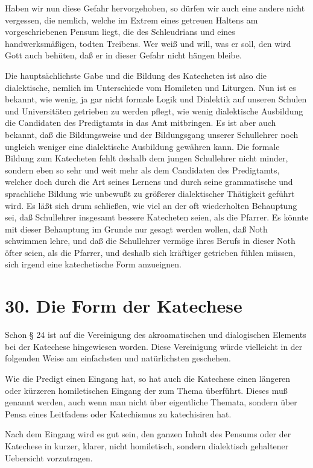 Haben wir nun diese Gefahr hervorgehoben, so dürfen wir auch eine andere nicht vergessen, die nemlich, welche im Extrem eines getreuen Haltens am vorgeschriebenen Pensum liegt, die des Schleudrians und eines handwerksmäßigen, todten Treibens. Wer weiß und will, was er soll, den wird Gott auch behüten, daß er in dieser Gefahr nicht hängen bleibe.

Die hauptsächlichste Gabe und die Bildung des Katecheten ist also die dialektische, nemlich im Unterschiede vom Homileten und Liturgen. Nun ist es bekannt, wie wenig, ja gar nicht formale Logik und Dialektik auf unseren Schulen und Universitäten getrieben zu werden pflegt, wie wenig dialektische Ausbildung die Candidaten des Predigtamts in das Amt mitbringen. Es ist aber auch bekannt, daß die Bildungsweise und der Bildungsgang unserer Schullehrer noch ungleich weniger eine dialektische Ausbildung gewähren kann. Die formale Bildung zum Katecheten fehlt deshalb dem
jungen Schullehrer nicht minder, sondern eben so sehr und weit mehr als dem Candidaten des Predigtamts, welcher doch durch die Art seines Lernens und durch seine grammatische und sprachliche Bildung wie unbewußt zu größerer dialektischer Thätigkeit geführt wird. Es läßt sich drum schließen, wie viel an der oft wiederholten Behauptung sei, daß Schullehrer insgesamt bessere Katecheten seien, als die Pfarrer. Es könnte mit dieser Behauptung im Grunde nur gesagt werden wollen, daß Noth schwimmen lehre, und daß die Schullehrer vermöge ihres Berufs in dieser Noth öfter seien, als die Pfarrer, und deshalb sich kräftiger getrieben fühlen müssen, sich irgend eine katechetische Form anzueignen.

\section{30. Die Form der Katechese}

Schon § 24 ist auf die Vereinigung des akroamatischen und dialogischen Elements bei der Katechese hingewiesen worden. Diese Vereinigung würde vielleicht in der folgenden Weise am einfachsten und natürlichsten geschehen.

Wie die Predigt einen Eingang hat, so hat auch die Katechese einen längeren oder kürzeren homiletischen Eingang der zum Thema überführt. Dieses muß genannt werden, auch wenn man nicht über eigentliche Themata, sondern über Pensa eines Leitfadens oder Katechismus zu katechisiren hat.

Nach dem Eingang wird es gut sein, den ganzen Inhalt des Pensums oder der Katechese in kurzer, klarer, nicht homiletisch, sondern dialektisch gehaltener Uebersicht vorzutragen.

